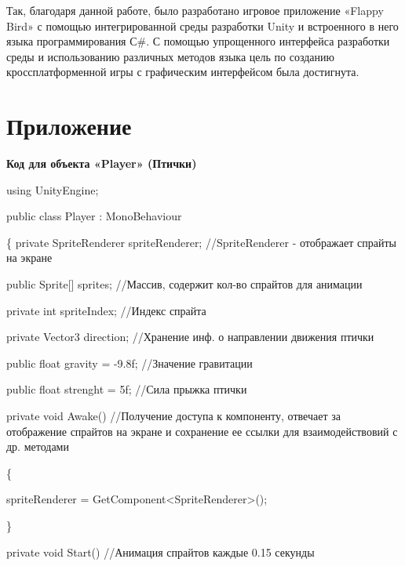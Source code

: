 \documentclass[14pt, oneside]{altsu-report}
\begin{document}
Так, благодаря данной работе, было разработано игровое приложение «Flappy Bird» с помощью интегрированной среды разработки Unity и встроенного в него языка программирования С\#. С помощью упрощенного интерфейса разработки среды и использованию различных методов языка цель по созданию кроссплатформенной игры с графическим интерфейсом была достигнута.

\newpage
{}
\printbibliography[title={Список использованной литературы}]

\appendix
\newpage
\chapter*{\raggedleft\label{appendix1}Приложение}

\begin{center}
\label{code:appendix}\textbf{Код для объекта «Player» (Птички)} 
\end{center}

using UnityEngine; 

public class Player : MonoBehaviour 

\{
    private SpriteRenderer spriteRenderer; //SpriteRenderer - отображает спрайты на экране

    public Sprite[] sprites; //Массив, содержит кол-во спрайтов для анимации

    private int spriteIndex; //Индекс спрайта

    private Vector3 direction; //Хранение инф. о направлении движения птички

    public float gravity = -9.8f; //Значение гравитации

    public float strenght = 5f; //Сила прыжка птички

    private void Awake() //Получение доступа к компоненту, отвечает за отображение спрайтов на экране и сохранение ее ссылки для взаимодействовий с др. методами

    \{

        spriteRenderer = GetComponent<SpriteRenderer>();

    \}

    private void Start() //Анимация спрайтов каждые 0.15 секунды
\end{document}
